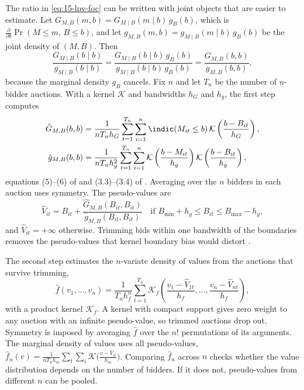  The ratio in \eqref{eq:15-lpv-foc} can be written with joint objects that are easier to
estimate. Let $G_{M,B}(m,b)=G_{M\mid B}(m\mid b)\,g_B(b)$, which is $\frac{\partial}{\partial b}\Pr(M\le
m,\,B\le b)$, and let $g_{M,B}(m,b)=g_{M\mid B}(m\mid b)\,g_B(b)$ be the joint density of $(M,B)$. Then
\begin{equation*}
  \frac{G_{M\mid B}(b\mid b)}{g_{M\mid B}(b\mid b)}
  =\frac{G_{M\mid B}(b\mid b)\,g_B(b)}{g_{M\mid B}(b\mid b)\,g_B(b)}
  =\frac{G_{M,B}(b,b)}{g_{M,B}(b,b)},
\end{equation*}
because the marginal density $g_B$ cancels. Fix $n$ and let $T_n$ be the number of $n$-bidder auctions.
With a kernel $\mathcal K$ and bandwidths $h_G$ and $h_g$, the first step computes
\begin{align}
  \hat G_{M,B}(b,b)&=\frac{1}{nT_nh_G}\sum_{t=1}^{T_n}\sum_{i=1}^{n}\indic(M_{it}\le b)\,
  \mathcal K\left(\frac{b-B_{it}}{h_G}\right),\label{eq:15-lpv-Ghat}\\
  \hat g_{M,B}(b,b)&=\frac{1}{nT_nh_g^2}\sum_{t=1}^{T_n}\sum_{i=1}^{n}
  \mathcal K\left(\frac{b-M_{it}}{h_g}\right)\mathcal K\left(\frac{b-B_{it}}{h_g}\right),\label{eq:15-lpv-ghat}
\end{align}
equations (5)--(6) of \citet{LiPerrigneVuong2002} and (3.3)--(3.4) of \citet{AtheyHaile2007}. Averaging over
the $n$ bidders in each auction uses symmetry. The pseudo-values are
\begin{equation}\label{eq:15-lpv-pseudo}
  \hat V_{it}=B_{it}+\frac{\hat G_{M,B}(B_{it},B_{it})}{\hat g_{M,B}(B_{it},B_{it})}
  \quad\text{if } B_{\min}+h_g\le B_{it}\le B_{\max}-h_g,
\end{equation}
and $\hat V_{it}=+\infty$ otherwise. Trimming bids within one bandwidth of the boundaries removes the
pseudo-values that kernel boundary bias would distort \citep[p.~181]{LiPerrigneVuong2002}.

The second step estimates the $n$-variate density of values from the auctions that survive trimming,
\begin{equation}\label{eq:15-lpv-fhat}
  \hat f(v_1,\dots,v_n)=\frac{1}{T_nh_f^n}\sum_{t=1}^{T_n}
  \mathcal K_f\left(\frac{v_1-\hat V_{1t}}{h_f},\dots,\frac{v_n-\hat V_{nt}}{h_f}\right),
\end{equation}
with a product kernel $\mathcal K_f$. A kernel with compact support gives zero weight to any auction with
an infinite pseudo-value, so trimmed auctions drop out. Symmetry is imposed by averaging $\hat f$ over the
$n!$ permutations of its arguments. The marginal density of values uses all pseudo-values,
$\hat f_n(v)=\frac{1}{nT_nh_m}\sum_t\sum_i\mathcal K\bigl(\frac{v-\hat V_{it}}{h_m}\bigr)$. Comparing
$\hat f_n$ across $n$ checks whether the value distribution depends on the number of bidders. If it does
not, pseudo-values from different $n$ can be pooled.

